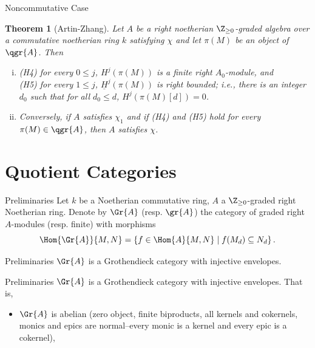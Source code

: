 \documentclass{beamer}
\newtheorem{thm}{Theorem}
\theoremstyle{definition}
\begin{document}
\begin{frame}{Noncommutative Case}
  \setcounter{thm}{1}
  \begin{thm}[Artin-Zhang]
    Let $A$ be a right noetherian $\Z_{\geq 0}$-graded algebra over a commutative noetherian ring $k$ satisfying $\chi$ and let $\pi(M)$ be an object of $\qgr{A}$.
    Then
    \begin{enumerate}[(i)]
    \item
      \begin{center}
        \begin{flushleft}
          (H4) for every $0 \leq j$, $H^j(\pi(M))$ is a finite right $A_0$-module, and\\
          (H5) for every $1 \leq j$, $\underline{H}^j(\pi(M))$ is right bounded; i.e., there is an integer $d_0$ such that for all $d_0 \leq d$, $H^{j}(\pi(M)[d]) = 0$.
        \end{flushleft}
      \end{center}
    \item
      Conversely, if $A$ satisfies $\chi_1$ and if (H4) and (H5) hold for every $\pi(M) \in \qgr{A}$, then $A$ satisfies $\chi$.
    \end{enumerate}
  \end{thm}
\end{frame}

\section{Quotient Categories}

\begin{frame}{Preliminaries}
  Let $k$ be a Noetherian commutative ring, $A$ a $\Z_{\geq 0}$-graded right Noetherian ring.
  Denote by $\Gr{A}$ (resp. $\gr{A}$) the category of graded right $A$-modules (resp. finite) with morphisms
  $$\Hom{\Gr{A}}{M,N} = \left\{f \in \Hom{A}{M,N} \;\middle\vert\; f(M_d) \subseteq N_d\right\}.$$
\end{frame}

\begin{frame}[fragile]{Preliminaries}
  $\Gr{A}$ is a Grothendieck category with injective envelopes.
\end{frame}

\begin{frame}[fragile]{Preliminaries}
  $\Gr{A}$ is a Grothendieck category with injective envelopes.
  That is,
  \begin{itemize}
  \item
    $\Gr{A}$ is abelian (zero object, finite biproducts, all kernels and cokernels, monics and epics are normal--every monic is a kernel and every epic is a cokernel),
  \end{itemize}
\end{frame}
\end{document}
